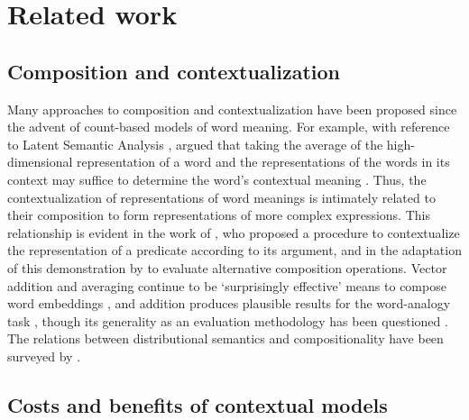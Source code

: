 \section{Related work}
\label{sec:related-work}

\subsection{Composition and contextualization}

Many approaches to composition and contextualization have been proposed since the
advent of count-based models of word meaning.
For example, with reference to Latent Semantic Analysis \parencites{Deerwester1990},
\citeauthor{Landauer1997} argued that taking the average of the high-dimensional
representation of a word and the representations of the words in its context may
suffice to determine the word's contextual meaning \parencites*[229-230]{Landauer1997}.
Thus, the contextualization of representations of word meanings is intimately related
to their composition to form representations of more complex expressions.
This relationship is evident in the work of \textcites{Kintsch2001}, who proposed a
procedure to contextualize the representation of a predicate according to its argument,
and in the adaptation of this demonstration by \textcites{Mitchell2008} to evaluate
alternative composition operations.
Vector addition and averaging continue to be `surprisingly effective' means to compose
word embeddings \parencites[10]{Boleda2020}, and addition produces plausible results
for the word-analogy task \parencites[9]{Mikolov2013}[7]{Mikolov2013a}, though its
generality as an evaluation methodology has been questioned
\parencites[1300]{Lenci2022}.
The relations between distributional semantics and compositionality have been surveyed
by \textcites{Erk2012}{Clark2015}{Boleda2016}.

\subsection{Costs and benefits of contextual models}

